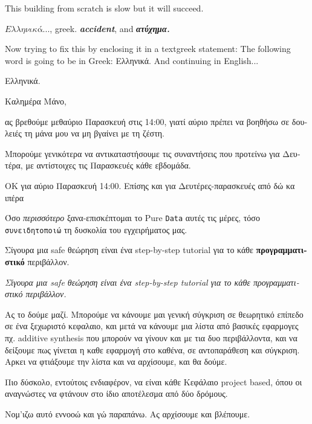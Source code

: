 \documentclass[fontsize=10pt, twoside=false, numbers=noenddot]{kaobook}
\begin{document}


This building from scratch is slow but it will succeed.

\(Ελληνικά ...\), greek. \textbf{\textit{accident}}, and \textbf{\textit{ατύχημα.}}

Now trying to fix this by enclosing it in a textgreek statement:
The following word is going to be in Greek: \textgreek{Ελληνικά}. And continuing in English...


\begin{greek}
  Ελληνικά.

  Καλημέρα Μάνο,

    ας βρεθούμε μεθαύριο \textsf{Παρασκευή} στις 14:00, γιατί αύριο πρέπει να βοηθήσω σε δουλειές τη μάνα μου να μη βγαίνει με τη ζέστη.

    Μπορούμε γενικότερα να αντικαταστήσουμε τις συναντήσεις που προτείνω για Δευτέρα, με αντίστοιχες τις Παρασκευές κάθε εβδομάδα.


ΟΚ για αύριο Παρασκευή 14:00.
Επίσης και για Δευτέρες-παρασκευές από δώ κα ιπέρα

    Όσο \textit{περισσότερο} ξανα-επισκέπτομαι το Pure \texttt{Data} αυτές τις μέρες, τόσο \texttt{συνειδητοποιώ} τη δυσκολία του εγχειρήματος μας.

    Σίγουρα μια safe θεώρηση είναι ένα step-by-step tutorial για το κάθε \textbf{προγραμματιστικό} περιβάλλον.

\textit{Σίγουρα μια safe θεώρηση είναι ένα step-by-step tutorial για το κάθε προγραμματιστικό περιβάλλον.}


Ας το δούμε μαζί. Μπορούμε να κάνουμε μαι γενική σύγκριση σε θεωρητικό επίπεδο σε ένα ξεχωριστό κεφαλαιο,
και μετά να κάνουμε μια λίστα από βασικές εφαρμογες πχ. additive synthesis που μπορούν να γίνουν και με τια
δυο περιβάλλοντα, και να δείξουμε πως γίνεται η καθε εφαρμογή στο καθένα, σε αντοπαράθεση και σύγκριση.
Αρκει να φτιάξουμε την λίστα και να αρχίσουμε, και θα δούμε.

    Πιο δύσκολο, εντούτοις ενδιαφέρον, να είναι κάθε Κεφάλαιο project based, όπου οι αναγνώστες να φτάνουν στο ίδιο αποτέλεσμα από δύο δρόμους.


Νομ'ιζω αυτό εννοοώ και γώ παραπάνω. Ας αρχίσουμε και βλέπουμε.
\end{greek}
\end{document}

